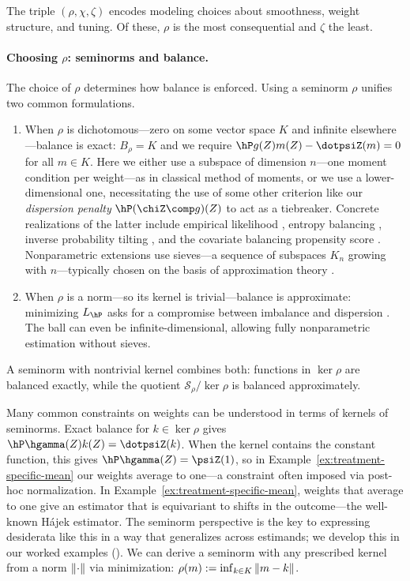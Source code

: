 \documentclass{article}
\newcommand{\calS}{\mathcal{S}}
\begin{document}
The triple $(\rho, \chi, \zeta)$ encodes modeling choices about smoothness, weight structure, and tuning. Of these, $\rho$ is the most consequential and $\zeta$ the least.

\paragraph{Choosing $\rho$: seminorms and balance.}
The choice of $\rho$ determines how balance is enforced. Using a seminorm $\rho$ unifies two common formulations.
\begin{enumerate}
\item When $\rho$ is dichotomous---zero on some vector space $K$ and infinite elsewhere---balance is exact: $B_\rho = K$ and we require $\hP g(Z)m(Z) - \dotpsiZ(m)=0$ for all $m \in K$. Here we either use a subspace of dimension $n$---one moment condition per weight---as in classical method of moments, or we use a lower-dimensional one, necessitating the use of some other criterion like our \emph{dispersion penalty} $\hP (\chiZ \comp g)(Z)$ to act as a tiebreaker. Concrete realizations of the latter include empirical likelihood \citep{owen2001empirical}, entropy balancing \citep{hainmueller2012entropy}, inverse probability tilting \citep{graham2012inverse}, and the covariate balancing propensity score \citep{imai2014covariate}. Nonparametric extensions use sieves---a sequence of subspaces $K_n$ growing with $n$---typically chosen on the basis of approximation theory \citep[e.g.,][]{chan2016globally}.
\item When $\rho$ is a norm---so its kernel is trivial---balance is approximate: minimizing $L_{\hP}$ asks for a compromise between imbalance and dispersion \citep{zubizarreta2015stable, kallus2020generalized}. The ball can even be infinite-dimensional, allowing fully nonparametric estimation without sieves.
\end{enumerate}
A seminorm with nontrivial kernel combines both: functions in $\ker\rho$ are balanced exactly, while the quotient $\calS_\rho / \ker\rho$ is balanced approximately.

Many common constraints on weights can be understood in terms of kernels of seminorms. Exact balance for $k \in \ker\rho$ gives $\hP \hgamma(Z) k(Z) = \dotpsiZ(k)$. When the kernel contains the constant function, this gives $\hP \hgamma(Z) = \psiZ(1)$, so in Example~\ref{ex:treatment-specific-mean} our weights average to one---a constraint often imposed via post-hoc normalization. In Example~\ref{ex:treatment-specific-mean}, weights that average to one give an estimator that is equivariant to shifts in the outcome---the well-known H\'ajek estimator. The seminorm perspective is the key to expressing desiderata like this in a way that generalizes across estimands; we develop this in our worked examples (). We can derive a seminorm with any prescribed kernel from a norm $\norm{\cdot}$ via minimization: $\rho(m) := \inf_{k \in K}\norm{m - k}$.
\end{document}
